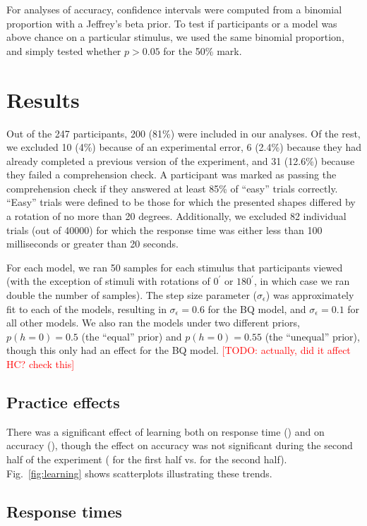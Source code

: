 \documentclass[10pt,letterpaper]{article}
\newcommand{\TODO}[1]{\textcolor{red}{[TODO: #1]}}
\newcommand{\Bq}[0]{BQ}
\begin{document}
For analyses of accuracy, confidence intervals were computed from a
binomial proportion with a Jeffrey's beta prior.  To test if
participants or a model was above chance on a particular stimulus, we
used the same binomial proportion, and simply tested whether $p>0.05$
for the 50\% mark.

\section{Results}

Out of the 247 participants, 200 (81\%) were included in our
analyses. Of the rest, we excluded 10 (4\%) because of an experimental
error, 6 (2.4\%) because they had already completed a previous version
of the experiment, and 31 (12.6\%) because they failed a comprehension
check. A participant was marked as passing the comprehension check if
they answered at least 85\% of ``easy'' trials correctly. ``Easy''
trials were defined to be those for which the presented shapes
differed by a rotation of no more than 20 degrees. Additionally, we
excluded 82 individual trials (out of 40000) for which the response
time was either less than 100 milliseconds or greater than 20 seconds.

For each model, we ran 50 samples for each stimulus that participants
viewed (with the exception of stimuli with rotations of $0^\prime$ or
$180^\prime$, in which case we ran double the number of samples). The
step size parameter ($\sigma_\epsilon$) was approximately fit to each
of the models, resulting in $\sigma_\epsilon=0.6$ for the \Bq{} model,
and $\sigma_\epsilon=0.1$ for all other models. We also ran the models
under two different priors, $p(h=0)=0.5$ (the ``equal'' prior) and
$p(h=0)=0.55$ (the ``unequal'' prior), though this only had an effect
for the \Bq{} model. \TODO{actually, did it affect HC?  check this}

\subsection{Practice effects} 

There was a significant effect of learning both on response time
(\ExpTrialTimeCorr{}) and on accuracy (\ExpTrialAccuracyCorr{}),
though the effect on accuracy was not significant during the second
half of the experiment (\ExpaTrialAccuracyCorr{} for the first half
vs. \ExpbTrialAccuracyCorr{} for the second
half). Fig.~\ref{fig:learning} shows scatterplots illustrating these
trends.

\subsection{Response times}
\end{document}
